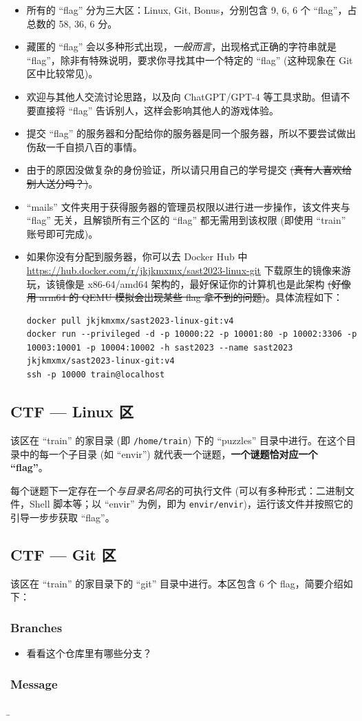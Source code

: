 \documentclass{article}
\begin{document}
	\begin{itemize}
		\itemsep0pt
		\item 所有的 ``flag'' 分为三大区：Linux, Git, Bonus，分别包含 9, 6, 6 个 ``flag''，占总数的 58, 36, 6 分。
		\item 藏匿的 ``flag'' 会以多种形式出现，\textit{一般而言}，出现格式正确的字符串就是 ``flag''，除非有特殊说明，要求你寻找其中一个特定的 ``flag'' (这种现象在 Git 区中比较常见)。
		\item 欢迎与其他人交流讨论思路，以及向 ChatGPT/GPT-4 等工具求助。但请不要直接将 ``flag'' 告诉别人，这样会影响其他人的游戏体验。
		\item 提交 ``flag'' 的服务器和分配给你的服务器是同一个服务器，所以不要尝试做出伤敌一千自损八百的事情。
		\item 由于的原因没做复杂的身份验证，所以请只用自己的学号提交 \sout{(真有人喜欢给别人送分吗？)}。
		\item ``mails'' 文件夹用于获得服务器的管理员权限以进行进一步操作，该文件夹与 ``flag'' 无关，且解锁所有三个区的 ``flag'' 都无需用到该权限 (即使用 ``train'' 账号即可完成)。
		\item 如果你没有分配到服务器，你可以去 Docker Hub 中 \url{https://hub.docker.com/r/jkjkmxmx/sast2023-linux-git} 下载原生的镜像来游玩，该镜像是 x86-64/amd64 架构的，最好保证你的计算机也是此架构 \sout{(好像用 arm64 的 QEMU 模拟会出现某些 flag 拿不到的问题)}。具体流程如下：
		\begin{verbatim}
docker pull jkjkmxmx/sast2023-linux-git:v4
docker run --privileged -d -p 10000:22 -p 10001:80 -p 10002:3306 -p 10003:10001 -p 10004:10002 -h sast2023 --name sast2023 jkjkmxmx/sast2023-linux-git:v4
ssh -p 10000 train@localhost
		\end{verbatim}
	\end{itemize}

	\subsection{CTF --- Linux 区}

	该区在 ``train'' 的家目录 (即 \texttt{/home/train}) 下的 ``puzzles'' 目录中进行。在这个目录中的每一个子目录 (如 ``envir'') 就代表一个谜题，\textbf{一个谜题恰对应一个 ``flag''}。

	每个谜题下一定存在一个\textit{与目录名同名}的可执行文件 (可以有多种形式：二进制文件，Shell 脚本等；以 ``envir'' 为例，即为 \texttt{envir/envir})，运行该文件并按照它的引导一步步获取 ``flag''。

	\subsection{CTF --- Git 区}

	该区在 ``train'' 的家目录下的 ``git'' 目录中进行。本区包含 6 个 flag，简要介绍如下：

	\subsubsection{Branches}

	\begin{itemize}
		\item 看看这个仓库里有哪些分支？
	\end{itemize}

	\subsubsection{Message}

	\b
\end{document}
